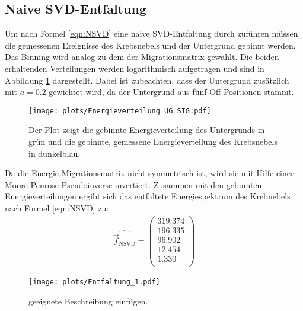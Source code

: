 \subsection{Naive SVD-Entfaltung}
Um nach Formel \eqref{eqn:NSVD} eine naive SVD-Entfaltung durch zuführen müssen die gemessenen Ereignisse des Krebsnebels und der Untergrund gebinnt werden. Das Binning wird analog zu dem der Migrationsmatrix gewählt. Die beiden erhaltenden Verteilungen werden logarithmisch aufgetragen und sind in Abbildung \ref{fig:UG_Sig} dargestellt. Dabei ist zubeachten, dass der Untergrund zusätzlich mit $a=0.2$ gewichtet wird, da der Untergrund aus fünf Off-Positionen stammt.\\
\begin{figure}
  \centering
  \texttt{[image: plots/Energieverteilung\_UG\_SIG.pdf]}
  \caption{Der Plot zeigt die gebinnte Energieverteilung des Untergrunds in grün und die gebinnte, gemessene Energieverteilung des Krebsnebels in dunkelblau.}
  \label{fig:UG_Sig}
\end{figure}
Da die Energie-Migrationsmatrix nicht symmetrisch ist, wird sie mit Hilfe einer Moore-Penrose-Pseudoinverse invertiert. Zusammen mit den gebinnten Energieverteilungen ergibt sich das entfaltete Energiespektrum des Krebnebels nach Formel \eqref{eqn:NSVD} zu:
\begin{align*}
	\hat{\vec{f}_{\text{NSVD}}} = \begin{pmatrix}
			319.374\\
			196.335\\
			96.902\\
			12.454\\
			1.330\\
	\end{pmatrix}
\end{align*}
\begin{figure}
  \centering
  \texttt{[image: plots/Entfaltung\_1.pdf]}
  \caption{geeignete Beschreibung einfügen.}
  \label{fig:E1}
\end{figure}
